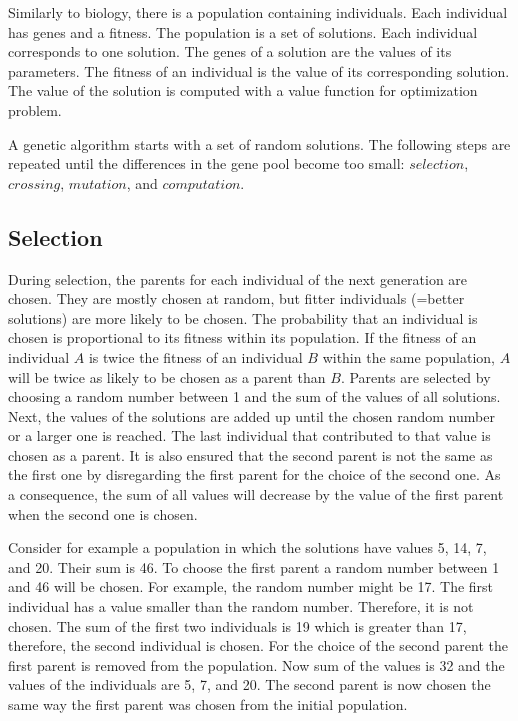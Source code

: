 \documentclass[10pt]{scrreprt}
\begin{document}
Similarly to biology, there is a population containing individuals. Each individual has genes and a fitness. The population is a set of solutions. Each individual corresponds to one solution. The genes of a solution are the values of its parameters. The fitness of an individual is the value of its corresponding solution. The value of the solution is computed with a value function for optimization problem.

A genetic algorithm starts with a set of random solutions. The following steps are repeated until the differences in the gene pool become too small: $selection$, $crossing$, $mutation$, and $computation$. \cite{genalg1}

\subsection{Selection}
During selection, the parents for each individual of the next generation are chosen. They are mostly chosen at random, but fitter individuals (=better solutions) are more likely to be chosen. The probability that an individual is chosen is proportional to its fitness within its population. \cite{genalg2} If the fitness of an individual $A$ is twice the fitness of an individual $B$ within the same population, $A$ will be twice as likely to be chosen as a parent than $B$. Parents are selected by choosing a random number between 1 and the sum of the values of all solutions. Next, the values of the solutions are added up until the chosen random number or a larger one is reached. The last individual that contributed to that value is chosen as a parent. It is also ensured that the second parent is not the same as the first one by disregarding the first parent for the choice of the second one. As a consequence, the sum of all values will decrease by the value of the first parent when the second one is chosen.

Consider for example a population in which the solutions have values 5, 14, 7, and 20. Their sum is 46. To choose the first parent a random number between 1 and 46 will be chosen. For example, the random number might be 17. The first individual has a value smaller than the random number. Therefore, it is not chosen. The sum of the first two individuals is 19 which is greater than 17, therefore, the second individual is chosen. For the choice of the second parent the first parent is removed from the population. Now sum of the values is 32 and the values of the individuals are 5, 7, and 20. The second parent is now chosen the same way the first parent was chosen from the initial population.
\end{document}
